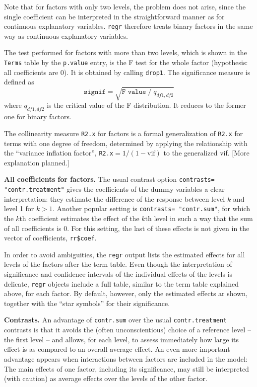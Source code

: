 \documentclass[11pt]{article}
\providecommand{\T}{\texttt}
\providecommand{\Tit}[1]{\textbf{#1}\hspace{1em}}
\begin{document}
Note that for factors with only two levels, the problem does not arise,
since the single 
coefficient can be interpreted in the straightforward manner as 
for continuous explanatory variables. \T{regr} therefore treats binary
factors in the same way as continuous explanatory variables.

The test performed for factors with more than two levels, which is shown 
in the \T{Terms} table by the \T{p.value} entry, 
is the F test for the whole factor (hypothesis: all coefficients are 0). 
It is obtained by calling \T{drop1}.
The significance measure is defined as 
\[
  \T{signif} = \sqrt{\T{F value}\;/\;q_{df1,df2}}
\]
where $q_{df1,df2}$ is the critical value of the F distribution.
It reduces to the former one for binary factors.

The collinearity measure \T{R2.x} for factors is a formal generalization of 
\T{R2.x} for terms with one degree of freedom, determined by applying
the relationship with the ``variance inflation factor'',
\T{R2.x}$=1/(1-\mbox{vif})$ to the generalized vif. 
[More explanation planned.]

\Tit{All coefficients for factors.}
The usual contrast option \T{contrasts=%
"contr.treatment"} gives the coefficients of the dummy variables 
a clear interpretation: 
they estimate the difference of the response between level $k$ and 
level 1 for $k>1$.
Another popular setting is \T{contrasts=%
"contr.sum"}, for which the $k$th coefficient estimates the effect 
of the $k$th level in such a way that the sum of all coefficients is 0.
For this setting, the last of these effects is not given in the
vector of coefficients, \T{rr\$coef}.

In order to avoid ambiguities, the \T{regr} output lists the 
estimated effects for all levels of the factors after the term table.
Even though the interpretation of significance and confidence intervals of
the individual effects of the levels is delicate, \T{regr} objects include
a full table, similar to the term table explained above, for each factor.
By default, however, only the estimated effects ar shown, together with the
``star symbols'' for their significance.

\Tit{Contrasts.}
An advantage of \T{contr.sum} over the usual \T{contr.treatment}
contrasts is that it avoids the (often unconscientious) choice of a
reference level -- the first level -- and allows, for each level, 
to assess immediately how large its effect is as compared to an overall
average effect.
An even more important advantage appears when interactions between factors
are included in the model: 
The main effects of one factor, including its significance, 
may still be interpreted (with caution) as average effects over the
levels of the other factor.
\end{document}
